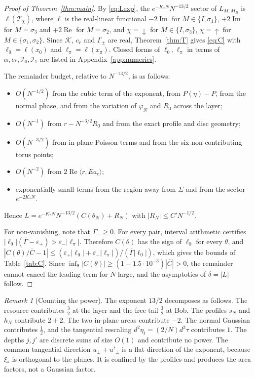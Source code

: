\documentclass[11pt]{amsart}
\theoremstyle{definition}
\theoremstyle{remark}
\newtheorem{remark}[theorem]{Remark}
\newcommand{\cK}{\mathcal{K}}
\newcommand{\up}{{\uparrow}}
\newcommand{\dn}{{\downarrow}}
\newcommand{\re}{\operatorname{Re}}
\newcommand{\im}{\operatorname{Im}}
\begin{document}
\begin{proof}[Proof of Theorem~\ref{thm:main}]
By \eqref{eq:Lexp}, the $e^{-K_*N}N^{-13/2}$ sector of $L_{M,M_B}$ is
$\ell(\mathcal T_\chi)$, where $\ell$ is the real-linear functional
$-2\im$ for $M\in\{I,\sigma_1\}$, $+2\im$ for $M=\sigma_3$ and $+2\re$ for
$M=\sigma_2$, and $\chi=\dn$ for $M\in\{I,\sigma_3\}$, $\chi=\up$ for
$M\in\{\sigma_1,\sigma_2\}$.  Since $\cK$, $c_r$ and $\Gamma_\pm$ are real,
Theorem~\ref{thm:T} gives \eqref{eq:C} with $\ell_0=\ell(x_0)$ and
$\ell_\pi=\ell(x_\pi)$.  Closed forms of $\ell_0,\ell_\pi$ in terms of
$\alpha,c_*,\mathcal I_0,\mathcal I_1$ are listed in
Appendix~\ref{app:numerics}.

The remainder budget, relative to $N^{-13/2}$, is as follows:
\begin{itemize}
\item $O(N^{-1/2})$ from the cubic term of the exponent, from
  $P(\eta)-P$, from the normal phase, and from the variation of
  $\varphi_N$ and $R_0$ across the layer;
\item $O(N^{-1})$ from $r-N^{-3/2}R_0$ and from the exact profile and disc
  geometry;
\item $O(N^{-3/2})$ from in-plane Poisson terms and from the six
  non-contributing torus points;
\item $O(N^{-2})$ from $2\re\langle r,Ea_c\rangle$;
\item exponentially small terms from the region away from $\Sigma$ and from
  the sector $e^{-2K_*N}$.
\end{itemize}
Hence $L=e^{-K_*N}N^{-13/2}(C(\theta_N)+R_N)$ with $|R_N|\le C'N^{-1/2}$.

For non-vanishing, note that $\Gamma_-\ge0$.  For every pair, interval
arithmetic certifies $|\ell_0|(\overline\Gamma-\varepsilon_+)>\varepsilon_-|\ell_\pi|$.
Therefore $C(\theta)$ has the sign of $\ell_0$ for every $\theta$, and
$|C(\theta)/\overline C-1|\le(\varepsilon_+|\ell_0|+\varepsilon_-|\ell_\pi|)/(\overline\Gamma|\ell_0|)$,
which gives the bounds of Table~\ref{tab:C}.  Since
$\inf_\theta|C(\theta)|\ge(1-1.5\cdot10^{-3})|\overline C|>0$, the remainder
cannot cancel the leading term for $N$ large, and the asymptotics of
$\delta=|L|$ follow.
\end{proof}

\begin{remark}[Counting the power]
The exponent $13/2$ decomposes as follows.  The resource contributes
$\frac32$ at the layer and the free tail $\frac32$ at Bob.  The profiles
$s_N$ and $h_N$ contribute $2+2$.  The two in-plane areas contribute $-2$.
The normal Gaussian contributes $\frac12$, and the tangential rescaling
$d^2\eta_t=(2/N)d^2\tau$ contributes $1$.  The depths $j,j'$ are discrete
sums of size $O(1)$ and contribute no power.  The common tangential
direction $u_\perp+u'_\perp$ is a flat direction of the exponent, because
$\xi_*$ is orthogonal to the planes.  It is confined by the profiles and
produces the area factors, not a Gaussian factor.
\end{remark}
\end{document}
